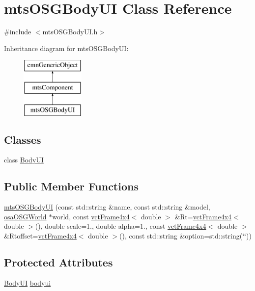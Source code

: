 \hypertarget{classmts_o_s_g_body_u_i}{}\section{mts\+O\+S\+G\+Body\+U\+I Class Reference}
\label{classmts_o_s_g_body_u_i}


{\ttfamily \#include $<$mts\+O\+S\+G\+Body\+U\+I.\+h$>$}

Inheritance diagram for mts\+O\+S\+G\+Body\+U\+I\+:\begin{figure}[H]
\begin{center}
\leavevmode
\includegraphics[height=3.000000cm]{da/dd7/classmts_o_s_g_body_u_i}
\end{center}
\end{figure}
\subsection*{Classes}
\begin{DoxyCompactItemize}
\item 
class \hyperlink{classmts_o_s_g_body_u_i_1_1_body_u_i}{Body\+U\+I}
\end{DoxyCompactItemize}
\subsection*{Public Member Functions}
\begin{DoxyCompactItemize}
\item 
\hyperlink{classmts_o_s_g_body_u_i_a57e2b01d12c8f0b1ffc71f2fa01df0e9}{mts\+O\+S\+G\+Body\+U\+I} (const std\+::string \&name, const std\+::string \&model, \hyperlink{classosa_o_s_g_world}{osa\+O\+S\+G\+World} $\ast$world, const \hyperlink{classvct_frame4x4}{vct\+Frame4x4}$<$ double $>$ \&Rt=\hyperlink{classvct_frame4x4}{vct\+Frame4x4}$<$ double $>$(), double scale=1., double alpha=1., const \hyperlink{classvct_frame4x4}{vct\+Frame4x4}$<$ double $>$ \&Rtoffset=\hyperlink{classvct_frame4x4}{vct\+Frame4x4}$<$ double $>$(), const std\+::string \&option=std\+::string(\char`\"{}\char`\"{}))
\end{DoxyCompactItemize}
\subsection*{Protected Attributes}
\begin{DoxyCompactItemize}
\item 
\hyperlink{classmts_o_s_g_body_u_i_1_1_body_u_i}{Body\+U\+I} \hyperlink{classmts_o_s_g_body_u_i_ae0dac024a22c934f1dff1da02f83ae8a}{bodyui}
\end{DoxyCompactItemize}
